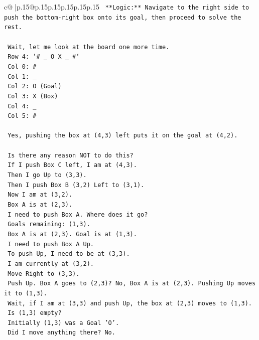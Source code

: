 \documentclass{article}
\begin{document}
{\begin{supertabular}{c@{$\;$}|p{.15\linewidth}@{}p{.15\linewidth}p{.15\linewidth}p{.15\linewidth}p{.15\linewidth}p{.15\linewidth}}
{{{\texttt{    **Logic:** Navigate to the right side to push the bottom{-}right box onto its goal, then proceed to solve the rest.} \\
\\ 
\texttt{    Wait, let me look at the board one more time.} \\
\texttt{    Row 4: `\# \_ O X \_ \#`} \\
\texttt{    Col 0: \#} \\
\texttt{    Col 1: \_} \\
\texttt{    Col 2: O (Goal)} \\
\texttt{    Col 3: X (Box)} \\
\texttt{    Col 4: \_} \\
\texttt{    Col 5: \#} \\
\\ 
\texttt{    Yes, pushing the box at (4,3) left puts it on the goal at (4,2).} \\
\\ 
\texttt{    Is there any reason NOT to do this?} \\
\texttt{    If I push Box C left, I am at (4,3).} \\
\texttt{    Then I go Up to (3,3).} \\
\texttt{    Then I push Box B (3,2) Left to (3,1).} \\
\texttt{    Now I am at (3,2).} \\
\texttt{    Box A is at (2,3).} \\
\texttt{    I need to push Box A. Where does it go?} \\
\texttt{    Goals remaining: (1,3).} \\
\texttt{    Box A is at (2,3). Goal is at (1,3).} \\
\texttt{    I need to push Box A Up.} \\
\texttt{    To push Up, I need to be at (3,3).} \\
\texttt{    I am currently at (3,2).} \\
\texttt{    Move Right to (3,3).} \\
\texttt{    Push Up. Box A goes to (2,3)? No, Box A is at (2,3). Pushing Up moves it to (1,3).} \\
\texttt{    Wait, if I am at (3,3) and push Up, the box at (2,3) moves to (1,3).} \\
\texttt{    Is (1,3) empty?} \\
\texttt{    Initially (1,3) was a Goal 'O'.} \\
\texttt{    Did I move anything there? No.} \\
}}}
\end{supertabular}}
\end{document}
